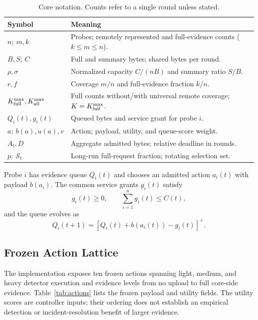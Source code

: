 \documentclass[10pt,journal]{IEEEtran}
\begin{document}
\begin{table}[t]
\centering
\caption{Core notation. Counts refer to a single round unless stated.}
\label{tab:notation}
\small
\renewcommand{\arraystretch}{1.08}
\begin{tabular}{@{}p{}p{}@{}}
\toprule
Symbol & Meaning \\
\midrule
$n;\ m,k$ & Probes; remotely represented and full-evidence counts ($k\leq m\leq n$). \\
$B,S;\ C$ & Full and summary bytes; shared bytes per round. \\
$\rho,\sigma$ & Normalized capacity $C/(nB)$ and summary ratio $S/B$. \\
$r,f$ & Coverage $m/n$ and full-evidence fraction $k/n$. \\
$K_{\rm full}^{\max},K_{\rm all}^{\max}$ & Full counts without/with universal remote coverage; $K=K_{\rm full}^{\max}$. \\
$Q_i(t),g_i(t)$ & Queued bytes and service grant for probe $i$. \\
$a;\ b(a),u(a),v$ & Action; payload, utility, and queue-score weight. \\
$A_t,D$ & Aggregate admitted bytes; relative deadline in rounds. \\
$p;\ \mathcal S_t$ & Long-run full-request fraction; rotating selection set. \\
\bottomrule
\end{tabular}
\end{table}
 Probe $i$ has evidence queue $Q_i(t)$ and
chooses an admitted action $a_i(t)$ with payload $b(a_i)$. The common service
grants $g_i(t)$ satisfy
\begin{equation}
g_i(t)\geq0,\qquad \sum_{i=1}^{n}g_i(t)\leq C(t),
\label{eq:cap}
\end{equation}
and the queue evolves as
\begin{equation}
Q_i(t+1)=\left[Q_i(t)+b(a_i(t))-g_i(t)\right]^+.
\label{eq:queue}
\end{equation}

\subsection{Frozen Action Lattice}
The implementation exposes ten frozen actions spanning light, medium, and
heavy detector execution and evidence levels from no upload to full core-side
evidence. Table~\ref{tab:actions} lists the frozen payload and utility fields.
The utility scores are controller inputs; their ordering does not establish
an empirical detection or incident-resolution benefit of larger evidence.
\end{document}
